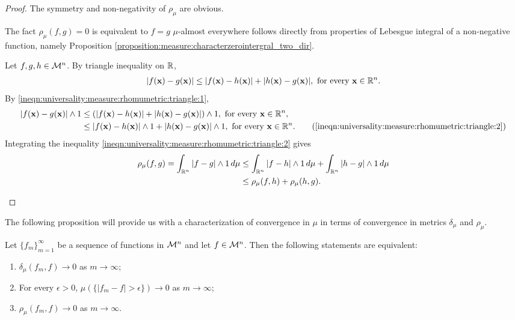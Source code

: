 \begin{proof}
The symmetry and non-negativity of $\rho_\mu$ are obvious.
\setcounter{step}{0}
\begin{step}
The fact $\rho_\mu(f, g) = 0$ is equivalent to $f = g$ $\mu$-almost everywhere follows directly from properties of Lebesgue integral of a non-negative function, namely Proposition \ref{proposition:measure:characterzerointergral_two_dir}. 
\end{step}
\begin{step}
Let $f, g, h \in {\mathcal M}^n$. By triangle inequality on ${\mathbb R}$, \begin{align}
    \label{ineqn:universality:measure:rhomumetric:triangle:1}
    |f(\mathbf{x}) - g(\mathbf{x})| \leq |f(\mathbf{x}) - h(\mathbf{x})| + |h(\mathbf{x}) - g(\mathbf{x})|, \text{ for every $\mathbf{x} \in {\mathbb R}^n$}.
\end{align}
By \ref{ineqn:universality:measure:rhomumetric:triangle:1}, 
\begin{subequations}\label{ineqn:universality:measure:rhomumetric:triangle:2}
\begin{align*}
    |f(\vec{x}) - g(\vec{x})| \wedge 1 &\leq (|f(\vec{x}) - h(\vec{x})| + |h(\vec{x}) - g(\vec{x})|) \wedge 1, \text{ for every $\vec{x} \in \R^n $}, \\
                                       &\leq |f(\vec{x}) - h(\vec{x})| \wedge 1 + |h(\vec{x}) - g(\vec{x})| \wedge 1, \text{ for every $\vec{x} \in \R^n $} .
     \tag{\ref{ineqn:universality:measure:rhomumetric:triangle:2}} 
\end{align*}
\end{subequations}
Integrating the inequality \ref{ineqn:universality:measure:rhomumetric:triangle:2} gives \begin{align*}
    \rho_\mu(f,g) = \int_{{\mathbb R}^n} | f - g | \wedge 1 \, d\mu &\leq  \int_{{\mathbb R}^n} | f - h | \wedge 1 \, d\mu + \int_{{\mathbb R}^n} | h - g | \wedge 1 \, d\mu \\ &\leq \rho_\mu(f, h) + \rho_\mu(h,g).
\end{align*}
\end{step}
\end{proof}
The following proposition will provide us with a characterization of convergence in $\mu$ in terms of convergence in metrics $\delta_\mu$ and $\rho_\mu$.
\begin{proposition}
\label{proposition:universality:measure:modes_convergence}
Let $\{ f_m \}_{m=1}^\infty$ be a sequence of functions in ${\mathcal M}^n$ and let $f \in {\mathcal M}^n$. Then the following statements are equivalent:
\begin{enumerate}[label=(\alph*),noitemsep]
\item $\delta_\mu (f_m, f) \to 0$ as $m \to \infty$;
\item For every $\epsilon > 0$, $\mu (\{ | f_m - f | > \epsilon \}) \to 0$ as $m \to \infty$;
\item $\rho_\mu (f_m, f) \to 0$ as $m \to \infty$.
\end{enumerate}
\end{proposition}
